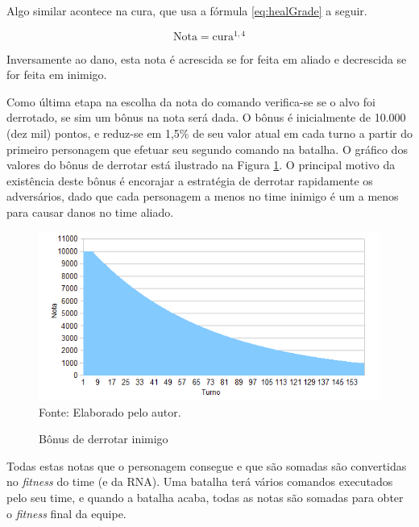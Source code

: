 \documentclass[
	12pt,					%
	openright,				%
	oneside,				%
	a4paper,				%
	bibjustif,				%
	chapter=TITLE,			%
	english,				%
	brazil,					%
	]{abntex2}
\newcommand{\source}[1]{\small Fonte: {#1}}
\begin{document}
	Algo similar acontece na cura,
	que usa a fórmula \eqref{eq:healGrade} a seguir.
	
	\begin{equation}
		\textrm{Nota} = \textrm{cura}^{1,4}
		\label{eq:healGrade}
	\end{equation}
	
	\vspace{3mm}
	
	Inversamente ao dano,
	esta nota é acrescida se for feita em aliado e decrescida se for feita em inimigo.
	
	Como última etapa na escolha da nota do comando verifica-se se o alvo foi derrotado,
	se sim um bônus na nota será dada.
	O bônus é inicialmente de 10.000 (dez mil) pontos,
	e reduz-se em 1,5\% de seu valor atual em cada turno a partir do primeiro personagem que efetuar seu segundo comando na batalha.
	O gráfico dos valores do bônus de derrotar está ilustrado na Figura \ref{fig:defeatBonusGraph}.
	O principal motivo da existência deste bônus é encorajar a estratégia de derrotar rapidamente os adversários,
	dado que cada personagem a menos no time inimigo é um a menos para causar danos no time aliado.
	
	\begin{figure}[ht!]
		\centering
		\caption{Bônus de derrotar inimigo}
		\includegraphics[scale=0.8]{img/DefeatBonusGraph.png}\\
		\vspace{0.5mm}
		\source{Elaborado pelo autor.}
		\label{fig:defeatBonusGraph}
	\end{figure}
	
	Todas estas notas que o personagem consegue e que são somadas são convertidas no \textit{fitness} do time (e da RNA).
	Uma batalha terá vários comandos executados pelo seu time,
	e quando a batalha acaba,
	todas as notas são somadas para obter o \textit{fitness} final da equipe.
	
\end{document}
